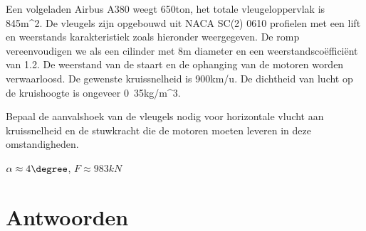 	\begin{toepassing}
		\label{airbus}
		Een volgeladen Airbus A380 weegt \unit{650}{ton}, het totale vleugeloppervlak is \unit{845}{m^2}. De vleugels zijn opgebouwd uit NACA SC(2) 0610 profielen met een lift en weerstands karakteristiek zoals hieronder weergegeven. De romp vereenvoudigen we als een cilinder met 8m diameter en een weerstandsco\"effici\"ent van 1.2. De weerstand van de staart en de ophanging van de motoren worden verwaarloosd. De gewenste kruissnelheid is \unit{900}{km/u}. De dichtheid van lucht op de kruishoogte is ongeveer \unit{0.35}{kg/m^3}.
		
		Bepaal de aanvalshoek van de vleugels nodig voor horizontale vlucht aan kruissnelheid en de stuwkracht die de motoren moeten leveren in deze omstandigheden.

	\end{toepassing}
	\begin{antwoord}
		$\alpha \approx \unit{4}{\degree}$, $F \approx \unit{983}{kN}$
	\end{antwoord}



	\section*{Antwoorden}
	\begin{multicols}{2}
	\end{multicols}